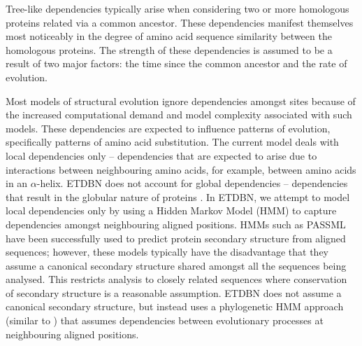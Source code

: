 \documentclass[nogrid]{MBE}%
\begin{document}
Tree-like dependencies typically arise when considering two or more homologous proteins related via a common ancestor. These dependencies manifest themselves most noticeably in the degree of amino acid sequence similarity between the homologous proteins. The strength of these dependencies is assumed to be a result of two major factors: the time since the common ancestor and the rate of evolution.

Most models of structural evolution ignore dependencies amongst sites because of the increased computational demand and model complexity associated with such models. These dependencies are expected to influence patterns of evolution, specifically patterns of amino acid substitution. The current model deals with local dependencies only -- dependencies that are expected to arise due to interactions between neighbouring amino acids, for example, between amino acids in an $\alpha$-helix. ETDBN does not account for global dependencies -- dependencies that result in the globular nature of proteins \citep{boomsma2008generative}. In ETDBN, we attempt to model local dependencies only by using a Hidden Markov Model (HMM) to capture dependencies amongst neighbouring aligned positions. HMMs such as PASSML \citep{li1998passml} have been successfully used to predict protein secondary structure from aligned sequences; however, these models typically have the disadvantage that they assume a canonical secondary structure shared amongst all the sequences being analysed. This restricts analysis to closely related sequences where conservation of secondary structure is a reasonable assumption. ETDBN does not assume a canonical secondary structure, but instead uses a phylogenetic HMM approach (similar to \citet{siepel2004combining}) that assumes dependencies between evolutionary processes at neighbouring aligned positions.
\end{document}
